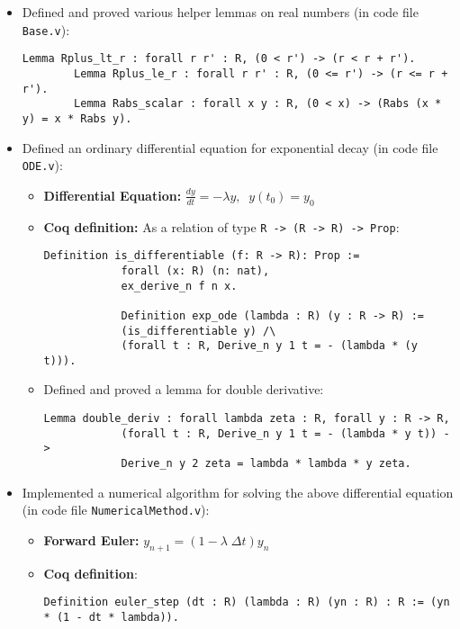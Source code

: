 \documentclass{article}
\begin{document}
\begin{itemize}
\begin{enumerate}
\begin{itemize}
        \end{itemize}
    \end{enumerate} 
    \item Defined and proved various helper lemmas on real numbers (in code file \texttt{Base.v}): 
    \begin{lstlisting}[language=Coq]
        Lemma Rplus_lt_r : forall r r' : R, (0 < r') -> (r < r + r').
        Lemma Rplus_le_r : forall r r' : R, (0 <= r') -> (r <= r + r').
        Lemma Rabs_scalar : forall x y : R, (0 < x) -> (Rabs (x * y) = x * Rabs y).
    \end{lstlisting}
    \item Defined an ordinary differential equation for exponential decay (in code file \texttt{ODE.v}):
    \begin{itemize}
        \item \textbf{Differential Equation:} $\frac{dy}{dt} = -\lambda y, \;\; y(t_0) = y_0$ 
        \item \textbf{Coq definition:} As a relation of type \texttt{R -> (R -> R) -> Prop}:
        \begin{lstlisting}[language=Coq]
            Definition is_differentiable (f: R -> R): Prop :=
            forall (x: R) (n: nat),  
            ex_derive_n f n x.

            Definition exp_ode (lambda : R) (y : R -> R) := 
            (is_differentiable y) /\ 
            (forall t : R, Derive_n y 1 t = - (lambda * (y t))).
        \end{lstlisting}
        \item Defined and proved a lemma for double derivative: 
        \begin{lstlisting}[language=Coq]
            Lemma double_deriv : forall lambda zeta : R, forall y : R -> R,
            (forall t : R, Derive_n y 1 t = - (lambda * y t)) -> 
            Derive_n y 2 zeta = lambda * lambda * y zeta.
        \end{lstlisting}
    \end{itemize}
    \newpage
    \item Implemented a numerical algorithm for solving the above differential equation (in code file \texttt{NumericalMethod.v}):
    \begin{itemize}
        \item \textbf{Forward Euler:} $y_{n+1} = (1 - \lambda \; \Delta t) y_n$
        \item \textbf{Coq definition}: 
        \begin{lstlisting}[language=Coq]
            Definition euler_step (dt : R) (lambda : R) (yn : R) : R := (yn * (1 - dt * lambda)). 


\end{lstlisting}
\end{itemize}
\end{itemize}
\end{document}
